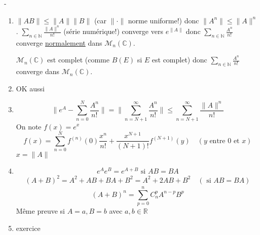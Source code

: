 \documentclass[a4paper]{report}
\newcommand\N{\ensuremath{\mathbb{N}}}
\newcommand\R{\ensuremath{\mathbb{R}}}
\theoremstyle{definition}
\begin{document}
\begin{preuve} -
    \begin{enumerate}
        \item 
            $\|AB\| \le \|A\|\|B\|$ (car $\| \cdot \|$ norme uniforme!) donc $\|A^n\| \le \|A\|^n$. $\sum_{n \in \N}^{} \frac{\|A\|^n}{n!}$ (série numérique!) converge vers $e^{\|A\|}$ donc $\sum_{n \in \N}^{} \frac{A^n}{n!}$ converge \underline{normalement} dans $\mathcal{M}_n(\mathbb{C})$. 
            \par
            $\mathcal{M}_n(\mathbb{C})$ est complet (comme $B(E)$ si  $E$ est complet) donc $\sum_{n \in \N}^{} \frac{A^n}{n!}$ converge dans $\mathcal{M}_n(\mathbb{C})$.
        \item OK aussi
        \item \[
            \|e^A - \sum_{n=0}^{N} \frac{A^n}{n!}\| = \|\sum_{n=N+1}^{\infty} \frac{A^n}{n!}\| \le \sum_{n = N+1}^{\infty} \frac{\|A\|^n}{n!}
            \] 
            On note $f(x) = e^x$
             \[
                 f(x) = \sum_{n=0}^{N} f^{(n)}(0) \frac{x^n}{n!} + \frac{x^{N+1}}{(N+1)!}f^{(N+1)}(y) \quad (y \text{ entre } 0 \text{ et } x)
            \] 
            $x = \|A\|$
        \item  
            \[
                e^Ae^B = e^{A + B} \text{ si } AB = BA
            \] 
            \begin{align*}
                (A + B)^2 = A^2 + AB + BA + B^2 = A^2 + 2AB + B^2 \quad (\text{ si } AB = BA)
            \end{align*}
            \[
                (A+B)^n = \sum_{p=0}^{n} C_n^p A^{n-p}B^p
            \] 
            Même preuve si $A = a, B = b$ avec  $a,b \in \R$
        \item exercice
    \end{enumerate}
\end{preuve}
\end{document}
